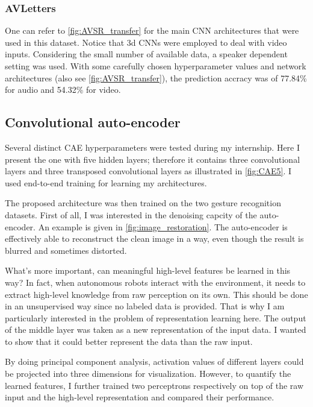 \subsubsection{AVLetters}

One can refer to \autoref{fig:AVSR_transfer} for the main CNN architectures
that were used in this dataset. 
Notice that 3d CNNs were employed to deal with video inputs.
Considering the small number of available data, a speaker dependent
setting was used.
With some carefully chosen hyperparameter values and network architectures
(also see \autoref{fig:AVSR_transfer}),
the prediction accracy was of 77.84\% for audio and 54.32\% for video.

\subsection{Convolutional auto-encoder} \label{subsection:CAE}

Several distinct CAE hyperparameters were tested during my internship.
Here I present the one with five hidden layers; therefore it contains
three convolutional layers and three transposed convolutional layers
as illustrated in \autoref{fig:CAE5}. I used end-to-end training for
learning my architectures.

The proposed architecture was then trained on the two gesture recognition
datasets. First of all, I was interested in the denoising capcity of
the auto-encoder. An example is given in \autoref{fig:image_restoration}.
The auto-encoder is effectively able to reconstruct the clean image in
a way, even though the result is blurred and sometimes distorted.

What's more important, can meaningful high-level features be
learned in this way? 
In fact, when autonomous robots interact with the environment, it needs
to extract high-level knowledge from raw perception on its own.
This should be done in an unsupervised way since no labeled data
is provided.
That is why I am particularly interested in the problem of representation
learning here. The output of the middle layer was taken as a new
representation of the input data.
I wanted to show that it could better represent the data than the raw input.

By doing principal component analysis, activation values of different
layers could be projected into three dimensions for visualization.
However, to quantify the learned features, I further trained two perceptrons
respectively on top of the raw input and the high-level representation
and compared their performance.

